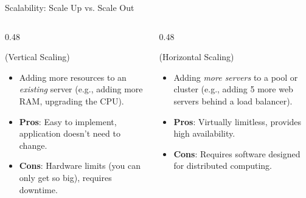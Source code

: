 \documentclass[aspectratio=169]{beamer}  %
\begin{document}
\begin{frame}[t]{Scalability: Scale Up vs. Scale Out}
    \begin{columns}[T]
        \begin{column}{0.48\textwidth}
            \begin{block}{ (Vertical Scaling)}
                \footnotesize
                \begin{itemize}
                    \item Adding more resources to an \textit{existing} server (e.g., adding more RAM, upgrading the CPU).
                    \item \textbf{Pros}: Easy to implement, application doesn't need to change.
                    \item \textbf{Cons}: Hardware limits (you can only get so big), requires downtime.
                \end{itemize}
            \end{block}
        \end{column}
        \begin{column}{0.48\textwidth}
            \begin{block}{ (Horizontal Scaling)}
                \footnotesize
                \begin{itemize}
                    \item Adding \textit{more servers} to a pool or cluster (e.g., adding 5 more web servers behind a load balancer).
                    \item \textbf{Pros}: Virtually limitless, provides high availability.
                    \item \textbf{Cons}: Requires software designed for distributed computing.
                \end{itemize}
            \end{block}
        \end{column}
    \end{columns}
\end{frame}
\end{document}
